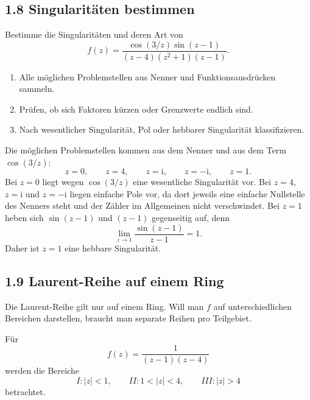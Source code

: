 \documentclass[11pt,a4paper]{article}
\newcommand{\ii}{\mathrm i}
\begin{document}
\subsection{1.8 Singularitäten bestimmen}
\begin{fragebox}
Bestimme die Singularitäten und deren Art von
\[
f(z)=\frac{\cos(3/z)\sin(z-1)}{(z-4)(z^2+1)(z-1)}.
\]
\end{fragebox}
\begin{kochrezeptbox}
\begin{enumerate}[label=\Roman*.]
\item Alle möglichen Problemstellen aus Nenner und Funktionsausdrücken sammeln.
\item Prüfen, ob sich Faktoren kürzen oder Grenzwerte endlich sind.
\item Nach wesentlicher Singularität, Pol oder hebbarer Singularität klassifizieren.
\end{enumerate}
\end{kochrezeptbox}
\begin{antwortbox}
Die möglichen Problemstellen kommen aus dem Nenner und aus dem Term $\cos(3/z)$:
\[
z=0,\qquad z=4,\qquad z=\ii,\qquad z=-\ii,\qquad z=1.
\]
Bei $z=0$ liegt wegen $\cos(3/z)$ eine wesentliche Singularität vor. Bei $z=4$, $z=\ii$ und $z=-\ii$ liegen einfache Pole vor, da dort jeweils eine einfache Nullstelle des Nenners steht und der Zähler im Allgemeinen nicht verschwindet. Bei $z=1$ heben sich $\sin(z-1)$ und $(z-1)$ gegenseitig auf, denn
\[
\lim_{z\to1}\frac{\sin(z-1)}{z-1}=1.
\]
Daher ist $z=1$ eine hebbare Singularität.
\end{antwortbox}

\subsection{1.9 Laurent-Reihe auf einem Ring}
Die Laurent-Reihe gilt nur auf einem Ring. Will man $f$ auf unterschiedlichen Bereichen darstellen, braucht man separate Reihen pro Teilgebiet.

\begin{beispielbox}
Für
\[
f(z)=\frac1{(z-1)(z-4)}
\]
werden die Bereiche
\[
I: |z|<1,
\qquad II: 1<|z|<4,
\qquad III: |z|>4
\]
betrachtet.
\end{beispielbox}

\begin{center}
\end{center}
\end{document}
